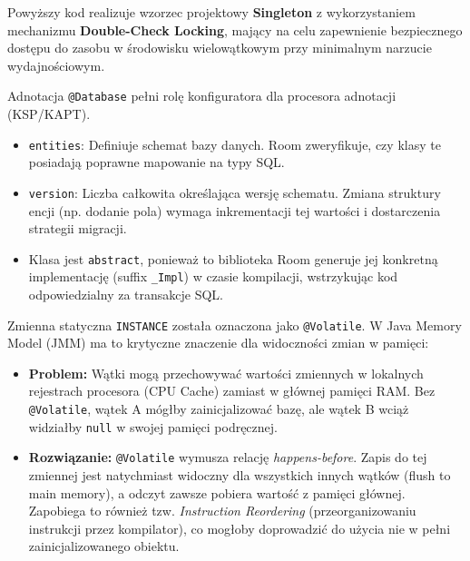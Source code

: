Powyższy kod realizuje wzorzec projektowy \textbf{Singleton} z wykorzystaniem mechanizmu \textbf{Double-Check Locking}, mający na celu zapewnienie bezpiecznego dostępu do zasobu w środowisku wielowątkowym przy minimalnym narzucie wydajnościowym.

Adnotacja \texttt{@Database} pełni rolę konfiguratora dla procesora adnotacji (KSP/KAPT).
\begin{itemize}
    \item \texttt{entities}: Definiuje schemat bazy danych. Room zweryfikuje, czy klasy te posiadają poprawne mapowanie na typy SQL.
    \item \texttt{version}: Liczba całkowita określająca wersję schematu. Zmiana struktury encji (np. dodanie pola) wymaga inkrementacji tej wartości i dostarczenia strategii migracji.
    \item Klasa jest \texttt{abstract}, ponieważ to biblioteka Room generuje jej konkretną implementację (suffix \texttt{\_Impl}) w czasie kompilacji, wstrzykując kod odpowiedzialny za transakcje SQL.
\end{itemize}

Zmienna statyczna \texttt{INSTANCE} została oznaczona jako \texttt{@Volatile}. W Java Memory Model (JMM) ma to krytyczne znaczenie dla widoczności zmian w pamięci:
\begin{itemize}
    \item \textbf{Problem:} Wątki mogą przechowywać wartości zmiennych w lokalnych rejestrach procesora (CPU Cache) zamiast w głównej pamięci RAM. Bez \texttt{@Volatile}, wątek A mógłby zainicjalizować bazę, ale wątek B wciąż widziałby \texttt{null} w swojej pamięci podręcznej.
    \item \textbf{Rozwiązanie:} \texttt{@Volatile} wymusza relację \textit{happens-before}. Zapis do tej zmiennej jest natychmiast widoczny dla wszystkich innych wątków (flush to main memory), a odczyt zawsze pobiera wartość z pamięci głównej. Zapobiega to również tzw. \textit{Instruction Reordering} (przeorganizowaniu instrukcji przez kompilator), co mogłoby doprowadzić do użycia nie w pełni zainicjalizowanego obiektu.
\end{itemize}

